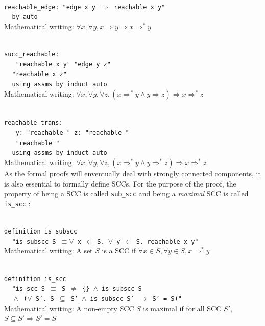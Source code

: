 \documentclass[a4 paper, 12pt]{article}
\newcommand{\lm}{{\color{isa_blue}{lemma}}}
\newcommand{\where}{{\color{isa_green}{where}}}
\renewcommand{\and}{{\color{isa_green}{and}}}
\newcommand{\assumes}{{\color{isa_green}{assumes}}}
\newcommand{\shows}{{\color{isa_green}{shows}}}
\newcommand{\isa}[1]{\small\texttt{\\\noindent#1}}
\newcommand{\blue}[1]{{\color{isa_dark_blue}{#1}}}
\theoremstyle{definition}
\begin{document}
\isa{
\lm{} reachable\_edge: "edge {\color{isa_dark_blue}x y} $\Longrightarrow$ reachable {\color{isa_dark_blue}x y}"\\
$~~~~~${\color{isa_blue}by} auto\\
}
Mathematical writing: $\forall x, \forall y, x \Rightarrow y \Longrightarrow x \Rightarrow^* y$

\isa{
\lm{} succ\_reachable:\\
$~~~~~$\assumes{} "reachable {\color{isa_dark_blue}x y}" \and{} "edge {\color{isa_dark_blue}y z}"\\
$~~~~~$\shows "reachable {\color{isa_dark_blue}x z}"\\
$~~~~~${\color{isa_blue}using} assms {\color{isa_blue}by} induct auto\\
}
Mathematical writing: $\forall x, \forall y, \forall z, (x \Rightarrow^* y \wedge y \Rightarrow z) \Longrightarrow x \Rightarrow^* z$

\isa{
\lm{} reachable\_trans:\\
$~~~~~$\assumes{} y: "reachable \blue{x y}" \and{} z: "reachable \blue{y z}"\\
$~~~~~$\shows{} "reachable \blue{x z}"\\
$~~~~~${\color{isa_blue}using} assms {\color{isa_blue}by} induct auto\\
}
Mathematical writing: $\forall x, \forall y, \forall z, (x \Rightarrow^* y \wedge y \Rightarrow^* z) \Longrightarrow x \Rightarrow^* z$\\

As the formal proofs will enventually deal with strongly connected components, it is also essential to formally define SCCs. For the purpose of the proof, the property of being a SCC is called \texttt{sub\_scc} and being a \textit{maximal} SCC is called \texttt{is\_scc} :

\isa{
{\color{isa_blue}definition} is\_subscc \where\\
$~~~~~$"is\_subscc S $\equiv \forall$ x $\in$ S. $\forall$ y $\in$ S. reachable x y"\\
}
Mathematical writing: A set $S$ is a SCC if $\forall x \in S, \forall y \in S, x \Rightarrow^* y$

\isa{
{\color{isa_blue}definition} is\_scc \where\\
$~~~~~$"is\_scc S $\equiv$ S $\neq$ \{\} $\wedge$ is\_subscc S\\
$~~~~~\wedge$ ($\forall$ S'. S $\subseteq$ S' $\wedge$ is\_subscc S' $\longrightarrow$ S' = S)"\\
}
Mathematical writing: A non-empty SCC $S$ is maximal if for all SCC $S'$, $S \subseteq S' \Longrightarrow S'=S$\\
\end{document}
